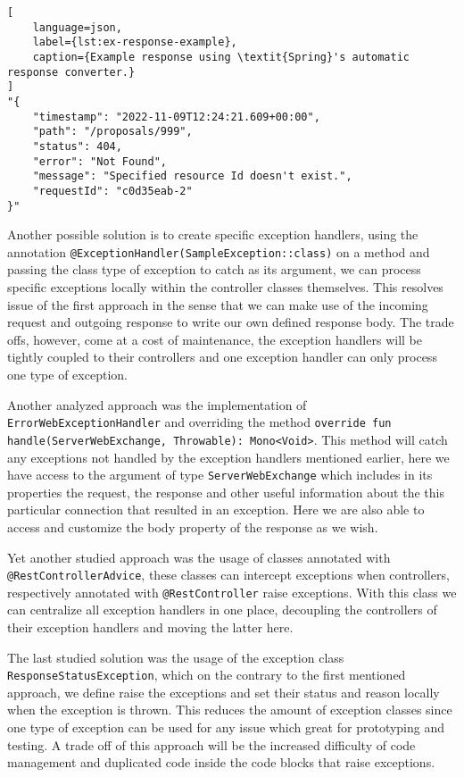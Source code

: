 \begin{lstlisting}[
    language=json,
    label={lst:ex-response-example},
    caption={Example response using \textit{Spring}'s automatic response converter.}
]
"{
    "timestamp": "2022-11-09T12:24:21.609+00:00",
    "path": "/proposals/999",
    "status": 404,
    "error": "Not Found",
    "message": "Specified resource Id doesn't exist.",
    "requestId": "c0d35eab-2"
}"
\end{lstlisting}


Another possible solution is to create specific exception handlers, using the annotation \texttt{@ExceptionHandler(SampleException::class)} on a method and passing the class type of exception to catch as its argument, we can process specific exceptions locally within the controller classes themselves. This resolves issue of the first approach in the sense that we can make use of the incoming request and outgoing response to write our own defined response body. 
The trade offs, however, come at a cost of maintenance, the exception handlers will be tightly coupled to their controllers and one exception handler can only process one type of exception.

Another analyzed approach was the implementation of \texttt{ErrorWebExceptionHandler} and overriding the method \texttt{override fun handle(ServerWebExchange, Throwable): Mono<Void>}. This method will catch any exceptions not handled by the exception handlers mentioned earlier, here we have access to the argument of type \texttt{ServerWebExchange} which includes in its properties the request, the response and other useful information about the this particular connection that resulted in an exception. Here we are also able to access and customize the body property of the response as we wish.

Yet another studied approach was the usage of classes annotated with \texttt{@RestControllerAdvice}, these classes can intercept exceptions when controllers, respectively annotated with \texttt{@RestController} raise exceptions. With this class we can centralize all exception handlers in one place, decoupling the controllers of their exception handlers and moving the latter here. 

The last studied solution was the usage of the exception class \texttt{ResponseStatusException}, which on the contrary to the first mentioned approach, we define raise the exceptions and set their status and reason locally when the exception is thrown. This reduces the amount of exception classes since one type of exception can be used for any issue which great for prototyping and testing. A trade off of this approach will be the increased difficulty of code management and duplicated code inside the code blocks that raise exceptions. 

